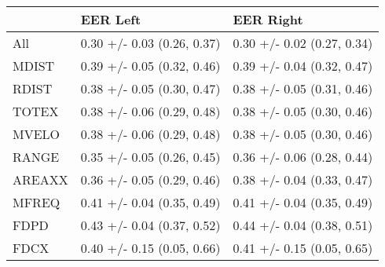 \begin{tabular}{lll}
\toprule
{} &                    EER Left &                   EER Right \\
\midrule
All    &  0.30 +/- 0.03 (0.26, 0.37) &  0.30 +/- 0.02 (0.27, 0.34) \\
MDIST  &  0.39 +/- 0.05 (0.32, 0.46) &  0.39 +/- 0.04 (0.32, 0.47) \\
RDIST  &  0.38 +/- 0.05 (0.30, 0.47) &  0.38 +/- 0.05 (0.31, 0.46) \\
TOTEX  &  0.38 +/- 0.06 (0.29, 0.48) &  0.38 +/- 0.05 (0.30, 0.46) \\
MVELO  &  0.38 +/- 0.06 (0.29, 0.48) &  0.38 +/- 0.05 (0.30, 0.46) \\
RANGE  &  0.35 +/- 0.05 (0.26, 0.45) &  0.36 +/- 0.06 (0.28, 0.44) \\
AREAXX &  0.36 +/- 0.05 (0.29, 0.46) &  0.38 +/- 0.04 (0.33, 0.47) \\
MFREQ  &  0.41 +/- 0.04 (0.35, 0.49) &  0.41 +/- 0.04 (0.35, 0.49) \\
FDPD   &  0.43 +/- 0.04 (0.37, 0.52) &  0.44 +/- 0.04 (0.38, 0.51) \\
FDCX   &  0.40 +/- 0.15 (0.05, 0.66) &  0.41 +/- 0.15 (0.05, 0.65) \\
\bottomrule
\end{tabular}
